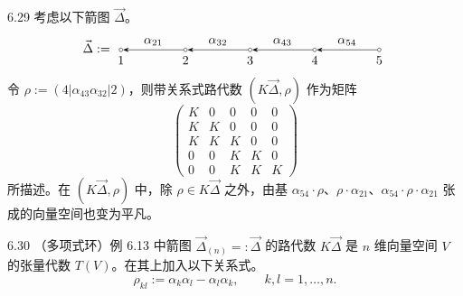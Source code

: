 \begin{example}{6.29}
考虑以下箭图 $\vec{\Delta}$。
\[
\vec{\Delta}:=
\begin{tikzpicture}[baseline=-0.5ex]
  \node[draw,circle,inner sep=1pt,label=below:{$1$}] (v1) at (0,0) {};
  \node[draw,circle,inner sep=1pt,label=below:{$2$}] (v2) at (1.8,0) {};
  \node[draw,circle,inner sep=1pt,label=below:{$3$}] (v3) at (3.6,0) {};
  \node[draw,circle,inner sep=1pt,label=below:{$4$}] (v4) at (5.4,0) {};
  \node[draw,circle,inner sep=1pt,label=below:{$5$}] (v5) at (7.2,0) {};
  \draw[-{Stealth}] (v2) -- node[above]{$\alpha_{21}$} (v1);
  \draw[-{Stealth}] (v3) -- node[above]{$\alpha_{32}$} (v2);
  \draw[-{Stealth}] (v4) -- node[above]{$\alpha_{43}$} (v3);
  \draw[-{Stealth}] (v5) -- node[above]{$\alpha_{54}$} (v4);
\end{tikzpicture}
\]
令 $\rho:=(4|\alpha_{43}\alpha_{32}|2)$，则带关系式路代数 $(K\vec{\Delta},\rho)$ 作为矩阵
\[
\begin{pmatrix}
K & 0 & 0 & 0 & 0\\
K & K & 0 & 0 & 0\\
K & K & K & 0 & 0\\
0 & 0 & K & K & 0\\
0 & 0 & K & K & K
\end{pmatrix}
\]
所描述。在 $(K\vec{\Delta},\rho)$ 中，除 $\rho\in K\vec{\Delta}$ 之外，由基 $\alpha_{54}\cdot\rho$、$\rho\cdot\alpha_{21}$、$\alpha_{54}\cdot\rho\cdot\alpha_{21}$ 张成的向量空间也变为平凡。

\end{example}

\begin{example}{6.30}
（多项式环）例 6.13 中箭图 $\vec{\Delta}_{(n)}=:\vec{\Delta}$ 的路代数 $K\vec{\Delta}$ 是 $n$ 维向量空间 $V$ 的张量代数 $T(V)$。在其上加入以下关系式。
\[
\rho_{kl}:=\alpha_k\alpha_l-\alpha_l\alpha_k,\qquad k,l=1,\dots,n.
\]
\end{example}
